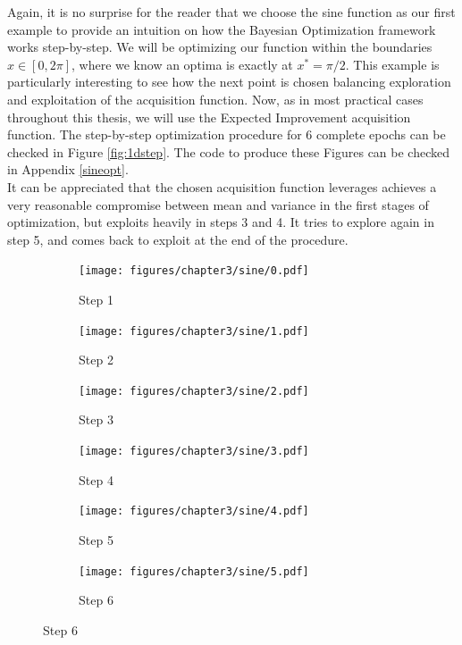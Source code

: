 \documentclass[10pt,a4paper,twoside]{book}
\begin{document}
Again, it is no surprise for the reader that we choose the sine function as our first example to provide an intuition on how the Bayesian Optimization framework works step-by-step. We will be optimizing our function within the boundaries $x \in [0, 2\pi]$, where we know an optima is exactly at $x^* = \pi/2$. This example is particularly interesting to see how the next point is chosen balancing exploration and exploitation of the acquisition function. Now, as in most practical cases throughout this thesis, we will use the Expected Improvement acquisition function. The step-by-step optimization procedure for 6 complete epochs can be checked in Figure \ref{fig:1dstep}. The code to produce these Figures can be checked in Appendix \ref{sineopt}.\\

It can be appreciated that the chosen acquisition function leverages achieves a very reasonable compromise between mean and variance in the first stages of optimization, but exploits heavily in steps 3 and 4. It tries to explore again in step 5, and comes back to exploit at the end of the procedure.


\begin{figure}
	\centering
	\caption{Six complete optimization epochs in the Bayesian Optimization framework for the target sine function in $x\in [0, 2\pi]$.}
	\label{fig:1dstep}
	\begin{subfigure}[b]{0.45\textwidth}
		\caption{Step 1}
		\texttt{[image: figures/chapter3/sine/0.pdf]}
	\end{subfigure}
	\begin{subfigure}[b]{0.45\textwidth}
		\caption{Step 2}
		\texttt{[image: figures/chapter3/sine/1.pdf]}
	\end{subfigure}
	
	\begin{subfigure}[b]{0.45\textwidth}
		\caption{Step 3}
		\texttt{[image: figures/chapter3/sine/2.pdf]}
	\end{subfigure}
	\begin{subfigure}[b]{0.45\textwidth}
		\caption{Step 4}
		\texttt{[image: figures/chapter3/sine/3.pdf]}
	\end{subfigure}
	
	\begin{subfigure}[b]{0.45\textwidth}
		\caption{Step 5}
		\texttt{[image: figures/chapter3/sine/4.pdf]}
	\end{subfigure}
	\begin{subfigure}[b]{0.45\textwidth}
		\caption{Step 6}
		\texttt{[image: figures/chapter3/sine/5.pdf]}
	\end{subfigure}
\end{figure}
\end{document}
